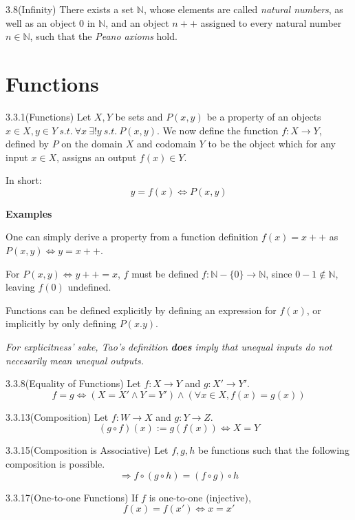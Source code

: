 \documentclass[letterpaper]{article}
\begin{document}
\begin{axbox}{3.8}{(Infinity)}
  There exists a set $\mathbb{N}$, whose elements are called \textit{natural numbers}, as well as an object $0$ in $\mathbb{N}$, and an object $n++$ assigned to every natural number $n \in \mathbb{N}$, such that the \textit{Peano axioms} hold.
\end{axbox}

\newpage

\section*{Functions}

\begin{defbox}{3.3.1}{(Functions)}
  Let $X,Y$ be sets and $P(x,y)$ be a property of an objects $x \in X, y \in Y ~s.t.~ \forall x ~ \exists! y ~s.t.~ P(x,y)$. We now define the function $f: X \to Y$, defined by $P$ on the domain $X$ and codomain $Y$ to be the object which for any input $x \in X$, assigns an output $f(x) \in Y$.\\

  \medskip

  In short:
  \[
    y = f(x) \iff P(x,y)
  \]

  \medskip

  \textbf{Examples}

  One can simply derive a property from a function definition $f(x) = x++$ as $P(x,y) \iff y = x++$.

  \medskip

  For $P(x,y) \iff y++ = x$, $f$ must be defined $f: \mathbb{N}-\{0\} \to \mathbb{N}$, since $0-1 \notin \mathbb{N}$, leaving $f(0)$ undefined.

  \bigskip\bigskip

  Functions can be defined explicitly by defining an expression for $f(x)$, or implicitly by only defining $P(x.y)$.

  \bigskip\bigskip

  \textit{For explicitness' sake, Tao's definition \textbf{does} imply that unequal inputs do not necesarily mean unequal outputs.}
\end{defbox}

\begin{defbox}{3.3.8}{(Equality of Functions)}
  Let $f: X \to Y$ and $g: X' \to Y'$.
  \[
    f = g \iff (X = X' \land Y = Y') \land (\forall x \in X, f(x) = g(x))
  \]
\end{defbox}

\begin{defbox}{3.3.13}{(Composition)}
  Let $f: W \to X$ and $g: Y \to Z$.
  \[
    (g \circ f)(x) := g(f(x)) \iff X = Y
  \]
\end{defbox}

\begin{lebox}{3.3.15}{(Composition is Associative)}
  Let $f,g,h$ be functions such that the following composition is possible.
  \[
    \Rightarrow f \circ (g \circ h) = (f \circ g) \circ h
  \]
\end{lebox}

\begin{defbox}{3.3.17}{(One-to-one Functions)}
  If $f$ is one-to-one (injective), 
  \[
    f(x) = f(x') \iff x = x'
  \]
\end{defbox}
\end{document}
